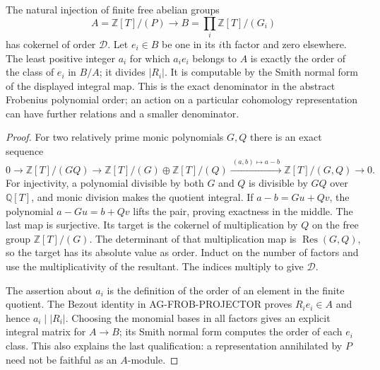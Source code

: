 \begin{proposition}
The natural injection of finite free abelian groups
\[
 A=\mathbb Z[T]/(P)\longrightarrow
 B=\prod_i\mathbb Z[T]/(G_i)
\]
has cokernel of order $\mathcal D$.  Let $e_i\in B$
be one in its $i$th factor and zero elsewhere.  The least
positive integer $a_i$ for which $a_ie_i$ belongs to $A$
is exactly the order of the class of $e_i$ in $B/A$;
it divides $|R_i|$.  It is computable by the Smith normal
form of the displayed integral map.  This is the exact
denominator in the abstract Frobenius polynomial order;
an action on a particular cohomology representation can
have further relations and a smaller denominator.
\end{proposition}
\begin{proof}
For two relatively prime monic polynomials $G,Q$ there
is an exact sequence
\[
 0\longrightarrow\mathbb Z[T]/(GQ)
 \longrightarrow\mathbb Z[T]/(G)\oplus\mathbb Z[T]/(Q)
 \xrightarrow{\ (a,b)\mapsto a-b\ }
 \mathbb Z[T]/(G,Q)\longrightarrow0.
\tag{AG-frob-crt}
\]
For injectivity, a polynomial divisible by both $G$ and
$Q$ is divisible by $GQ$ over $\mathbb Q[T]$, and monic
division makes the quotient integral.  If
$a-b=Gu+Qv$, the polynomial $a-Gu=b+Qv$ lifts the
pair, proving exactness in the middle.  The last map is
surjective.  Its target is the cokernel of multiplication
by $Q$ on the free group $\mathbb Z[T]/(G)$.
The determinant of that multiplication map is
$\operatorname{Res}(G,Q)$, so the target has its absolute
value as order.  Induct on the number of factors and use
the multiplicativity of the resultant.  The indices
multiply to give $\mathcal D$.

The assertion about $a_i$ is the definition of the order
of an element in the finite quotient.  The Bezout identity
in AG-FROB-PROJECTOR proves $R_ie_i\in A$ and hence
$a_i\mid |R_i|$.  Choosing the monomial bases in all
factors gives an explicit integral matrix for $A\to B$;
its Smith normal form computes the order of each $e_i$
class.  This also explains the last qualification: a
representation annihilated by $P$ need not be faithful
as an $A$-module.
\end{proof}


